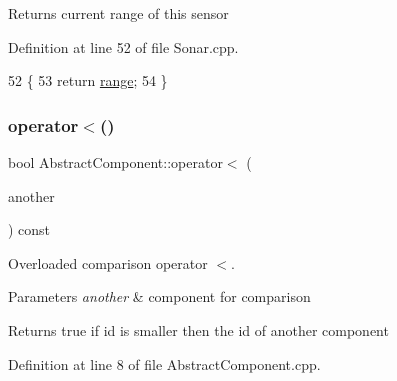 \begin{DoxyReturn}{Returns}
current range of this sensor 
\end{DoxyReturn}


Definition at line 52 of file Sonar.\+cpp.


\begin{DoxyCode}
52                          \{
53     \textcolor{keywordflow}{return} \hyperlink{class_sonar_a6b0f78a9151925ca61fe54c852c195bd}{range};
54 \}
\end{DoxyCode}
\mbox{\label{class_abstract_component_a0c2e458144111c5f599c66f168516abc}} 
\subsubsection{\texorpdfstring{operator$<$()}{operator<()}}
{\footnotesize\ttfamily bool Abstract\+Component\+::operator$<$ (\begin{DoxyParamCaption}\item[{const \hyperlink{class_abstract_component}{Abstract\+Component} \&}]{another }\end{DoxyParamCaption}) const\hspace{0.3cm}{\ttfamily [inherited]}}



Overloaded comparison operator \textquotesingle{}$<$\textquotesingle{}. 


\begin{DoxyParams}{Parameters}
{\em another} & component for comparison \\
\hline
\end{DoxyParams}
\begin{DoxyReturn}{Returns}
true if id is smaller then the id of another component 
\end{DoxyReturn}


Definition at line 8 of file Abstract\+Component.\+cpp.


